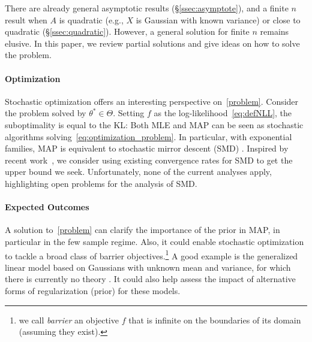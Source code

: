 \documentclass[twoside]{article}
\newcommand{\logpart}{A}
\newcommand{\nat}{\theta}
\begin{document}
There are already general asymptotic results (\S\ref{ssec:asymptote}), and a finite $n$ result when $\logpart$ is quadratic (e.g., $X$ is Gaussian with known variance)
or close to quadratic (\S\ref{ssec:quadratic}).
However, a  general solution for finite $n$ remains elusive. %
In this paper, we review partial solutions and give ideas on how to solve the problem.

\paragraph{Optimization} 
Stochastic optimization offers an interesting perspective on~\eqref{problem}.
Consider the problem
solved by $\nat^*\in \Theta$.
Setting $f$ as the log-likelihood~\eqref{eq:defNLL}, the suboptimality is equal to the KL:
\alignn{
	f(\nat) - f(\nat^*) = \KL\paren{p_{\nat^*} || p_{\nat} } .
	\label{eq:suboptimalityKL}
}
Both MLE and MAP can be seen as stochastic algorithms solving~\eqref{eq:optimization_problem}.
In particular, with exponential families, MAP is equivalent to stochastic mirror descent (SMD) \citep{nemirovski2009robust}.
Inspired by recent work~\citep{lepriol2021analysis, kunstner2020homeomorphic}, we consider using existing convergence rates for SMD to get the upper bound we seek.
Unfortunately, none of the current analyses apply, highlighting open problems for the analysis of SMD.

\paragraph{Expected Outcomes}
A solution to~\eqref{problem} can clarify the importance of the prior in MAP, in particular in the few sample regime. %
Also, it could enable stochastic optimization to tackle a broad class of barrier objectives.\footnote{we call \emph{barrier} an objective $f$ that is infinite on the boundaries of its domain (assuming they exist).}
A good example is the generalized linear model based on Gaussians with unknown mean and variance, for which there is currently no theory \citep{bach2013nonstronglyconvex}.
It could also help assess the impact of alternative forms of regularization (prior) for these models.
\end{document}
